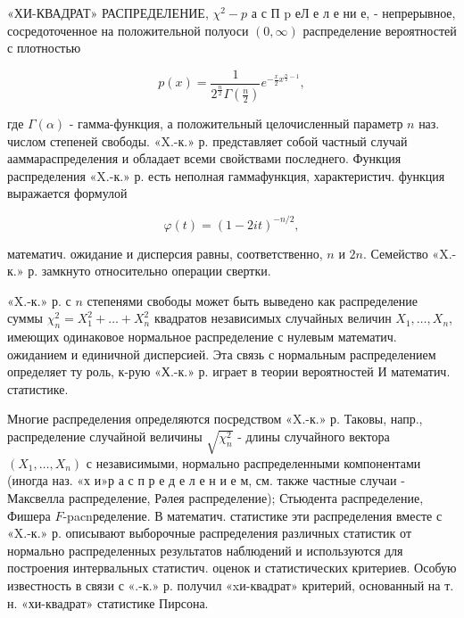 \documentclass[10pt]{article}
\begin{document}
«ХИ-КВАДРАТ» РАСПРЕДЕЛЕНИЕ, $\chi^{2}-p$ а с П p еЛ е л е ни е, - непрерывное, сосредоточенное на положительной полуоси $(0, \infty)$ распределение вероятностей с плотностью



\[

p(x)=\frac{1}{2^{\frac{n}{2}} \Gamma\left(\frac{n}{2}\right)} e^{-\frac{x}{2} x^{\frac{n}{2}-1}},

\]



где $\Gamma(\alpha)$ - гамма-функция, а положительный целочисленный параметр $n$ наз. числом степеней свободы. «X.-к.» р. представляет собой частный случай ааммараспределения и обладает всеми свойствами последнего. Функция распределения «X.-к.» р. есть неполная гаммафункция, характеристич. функция выражается формулой



\[

\varphi(t)=(1-2 i t)^{-n / 2},

\]



математич. ожидание и дисперсия равны, соответственно, $n$ и $2 n$. Семейство «X.-к.» р. замкнуто относительно операции свертки.



«X.-к.» р. с $n$ степенями свободы может быть выведено как распределение суммы $\chi_{n}^{2}=X_{1}^{2}+\ldots+X_{n}^{2}$ квадратов независимых случайных величин $X_{1}, \ldots, X_{n}$, имеющих одинаковое нормальное распределение с нулевым математич. ожиданием и единичной дисперсией. Эта связь с нормальным распределением определяет ту роль, к-рую «Х.-к.» р. играет в теории вероятностей И математич. статистике.



Многие распределения определяются посредством «X.-к.» р. Таковы, напр., распределение случайной величины $\sqrt{\chi_{n}^{2}}$ - длины случайного вектора $\left(X_{1}, \ldots, X_{n}\right)$ с независимыми, нормально распределенными компонентами (иногда наз. «х и»р а с п р е д е л е н и е м, см. также частные случаи - Максвелла распределение, Рәлея распределение); Стьюдента распределение, Фишера $F$-pacnределение. В математич. статистике эти распределения вместе с «X.-к.» р. описывают выборочные распределения различных статистик от нормально распределенных результатов наблюдений и используются для построения интервальных статистич. оценок и статистических критериев. Особую известность в связи с «.-к.» р. получил «xи-квадрат» критерий, основанный на т. н. «хи-квадрат» статистике Пирсона.
\end{document}
